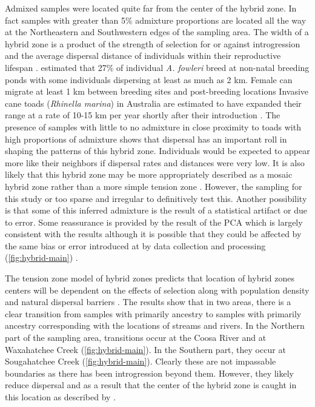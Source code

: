 Admixed samples were located quite far from the center of the hybrid zone. 
In fact samples with greater than 5\% admixture proportions are located all the
way at the Northeastern and Southwestern edges of the sampling area. 
The width of a hybrid zone is a product of the strength of selection for or against
introgression and the average dispersal distance of individuals within their 
reproductive lifespan \parencite{barton1985}.
\cite{breden1987} estimated that 27\% of individual \textit{A. fowleri} breed
at non-natal breeding ponds with some individuals dispersing at least as much 
as 2 km.
Female \amer can migrate at least 1 km between breeding sites and post-breeding
locations \parencite{forester2006}
Invasive cane toads (\textit{Rhinella marina}) in Australia are estimated to 
have expanded their range at a rate of 10-15 km per year shortly after their
introduction \parencite{urban2008}. 
The presence of samples with little to no admixture in close proximity to 
toads with high proportions of admixture shows that dispersal has an important  
roll in shaping the patterns of this hybrid zone.
Individuals would be expected to appear more like their neighbors if dispersal
rates and distances were very low.
It is also likely that this hybrid zone may be more appropriately described as 
a mosaic hybrid zone rather than a more simple tension zone \parencite{harrison1986}.
However, the sampling for this study or too sparse and irregular to definitively 
test this.
Another possibility is that some of this inferred admixture is the result of a 
statistical artifact or due to error. 
Some reassurance is provided by the result of the PCA which is largely consistent 
with the \structure results although it is possible that they could be affected 
by the same bias or error introduced at by data collection and processing (\cref{fig:hybrid-main}) \citationNeeded.

The tension zone model of hybrid zones predicts that location of hybrid zones
centers will be dependent on the effects of selection along with population 
density and natural dispersal barriers \parencite{barton1979}.
The \structure results show that in two areas, there is a clear transition from 
samples with primarily \amer ancestry to samples with primarily \terr ancestry 
corresponding with the locations of streams and rivers.
In the Northern part of the sampling area, transitions occur at the Coosa 
River and at Waxahatchee Creek (\cref{fig:hybrid-main}). 
In the Southern part, they occur at Sougahatchee Creek (\cref{fig:hybrid-main}).
Clearly these are not impassable boundaries as there has been introgression 
beyond them. 
However, they likely reduce dispersal and as a result that the center of the hybrid 
zone is caught in this location as described by \cite{barton1979}.

